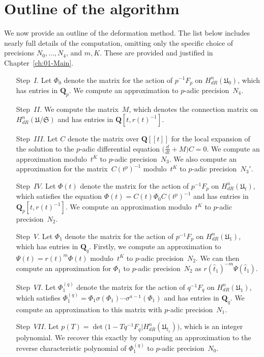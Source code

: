 
\section{Outline of the algorithm}

We now provide an outline of the deformation method.  The list below 
includes nearly full details of the computation, omitting only the 
specific choice of precisions $N_0, \dotsc, N_4$, and $m, K$.  
These are provided and justified in Chapter~\ref{ch:01-Main}.

\begin{enumerate}
\item[Step~$I$.]
Let $\Phi_0$ denote the matrix for the action of $p^{-1} F_p$ on 
$H_{dR}^{n}(\mathfrak{U}_0)$, which has entries in $\mathbf{Q}_p$.  
We compute an approximation to $p$-adic precision~$N_4$.
\item[Step~$II$.]
We compute the matrix~$M$, which denotes the connection matrix 
on $H_{dR}^{n}(\mathfrak{U}/\mathfrak{S})$ and has entries in 
$\mathbf{Q}[t,r(t)^{-1}]$.
\item[Step~$III$.]
Let $C$ denote the matrix over $\mathbf{Q}[[t]]$ for the local 
expansion of the solution to the $p$-adic differential equation 
$\bigl(\tfrac{d}{dt} + M\bigr) C = 0$.  We compute an approximation 
modulo~$t^K$ to $p$-adic precision~$N_3$.  We also compute an 
approximation for the matrix~$C(t^p)^{-1}$ modulo~$t^K$ to $p$-adic 
precision~$N_3'$.
\item[Step~$IV$.]
Let $\Phi(t)$ denote the matrix for the action of $p^{-1} F_p$ on 
$H_{dR}^{n}(\mathfrak{U}_t)$, which satisfies the equation 
$\Phi(t) = C(t) \Phi_0 C(t^p)^{-1}$ and has entries in 
$\mathbf{Q}_p[t,r(t)^{-1}]$.  We compute an approximation modulo~$t^K$ 
to $p$-adic precision~$N_2$.
\item[Step~$V$.]
Let $\Phi_1$ denote the matrix for the action of $p^{-1} F_p$ 
on $H_{dR}^{n}(\mathfrak{U}_1)$, which has entries in $\mathbf{Q}_q$. 
Firstly, we compute an approximation to $\Psi(t) = r(t)^m \Phi(t)$ 
modulo~$t^K$ to $p$-adic precision~$N_2$.  We can then compute an 
approximation for $\Phi_1$ to $p$-adic precision~$N_2$ as 
$r(\hat{t}_1)^{-m} \Psi(\hat{t}_1)$.
\item[Step~$VI$.]
Let $\Phi_1^{(q)}$ denote the matrix for the action of $q^{-1} F_q$ on 
$H_{dR}^{n}(\mathfrak{U}_1)$, which satisfies 
$\Phi_1^{(q)} = \Phi_1 \sigma(\Phi_1) \dotsm \sigma^{a-1}(\Phi_1)$ and 
has entries in $\mathbf{Q}_q$.  We compute an approximation to this 
matrix with $p$-adic precision~$N_1$.
\item[Step~$VII$.]
Let $p(T) = \det\bigl(1 - T q^{-1} F_q | H_{dR}^n(\mathfrak{U}_{t_1})\bigr)$, 
which is an integer polynomial.  We recover this exactly by computing 
an approximation to the reverse characteristic polynomial of $\Phi_1^{(q)}$ 
to $p$-adic precision~$N_0$.
\end{enumerate}

